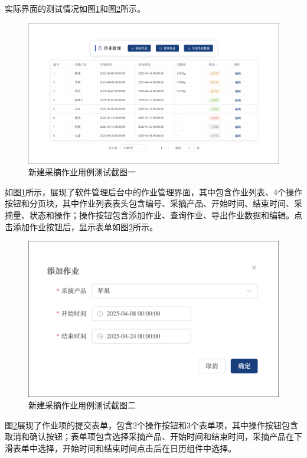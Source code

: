 实际界面的测试情况如图\ref{fig:work-new-result-1}和图\ref{fig:work-new-result-2}所示。

\begin{figure}[H]
    \centering
    \includegraphics[width=0.8\linewidth]{../result/work-new-result-1.png}
    \caption{新建采摘作业用例测试截图一}
    \label{fig:work-new-result-1}
\end{figure}

如图\ref{fig:work-new-result-1}所示，展现了软件管理后台中的作业管理界面，其中包含作业列表、4个操作按钮和分页块，其中作业列表表头包含编号、采摘产品、开始时间、结束时间、采摘量、状态和操作；操作按钮包含添加作业、查询作业、导出作业数据和编辑。点击添加作业按钮后，显示表单如图\ref{fig:work-new-result-2}所示。

\begin{figure}[H]
    \centering
    \includegraphics[width=0.8\linewidth]{../result/work-new-result-2.png}
    \caption{新建采摘作业用例测试截图二}
    \label{fig:work-new-result-2}
\end{figure}

图\ref{fig:work-new-result-2}展现了作业项的提交表单，包含2个操作按钮和3个表单项，其中操作按钮包含取消和确认按钮；表单项包含选择采摘产品、开始时间和结束时间，采摘产品在下滑表单中选择，开始时间和结束时间点击后在日历组件中选择。

